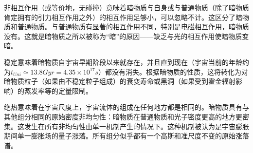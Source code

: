 非相互作用（或等价地，无碰撞）意味着暗物质与自身或与普通物质（除了暗物质肯定拥有的引力相互作用之外）的相互作用足够小，可以忽略不计。这区分了暗物质和普通物质。与普通物质有显著的相互作用不同，特别是电磁相互作用，暗物质没有。这就是暗物质之所以被称为“暗”的原因——缺乏与光的相互作用使暗物质变暗。

稳定意味着暗物质自宇宙早期阶段以来就存在，并且直到现在（宇宙当前的年龄约为$t_{Uni} \simeq 13.8 Gyr = 4.35 \times 10^{17} s$）都没有消失。根据暗物质的性质，这将转化为对暗物质粒子（如果由不稳定粒子组成）的衰变寿命或黑洞（如果受到霍金辐射影响）的蒸发率等的定量限制。

绝热意味着在宇宙尺度上，宇宙流体的组成在任何地方都是相同的。暗物质具有与其他组分相同的原始密度非均匀性：暗物质在普通物质和光子密度更高的地方更密集。这发生在所有非均匀性由单一机制产生的情况下。这种机制被认为是宇宙膨胀期间单一膨胀场的量子涨落。所有组分似乎都有一个高斯和准尺度不变的原始涨落谱。